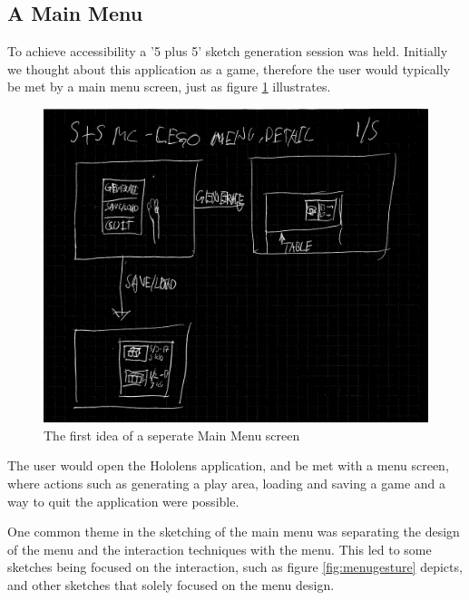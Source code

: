 \subsection{A Main Menu}
To achieve accessibility a '5 plus 5' sketch generation session was held. Initially we thought about this application as a game, therefore the user would typically be met by a main menu screen, just as figure \ref{fig:menu8} illustrates.
\begin{figure}[h]
	\centering
	\includegraphics[width=0.7\linewidth]{figures/Menu/menu8}
	\caption{The first idea of a seperate Main Menu screen}
	\label{fig:menu8}
\end{figure}
The user would open the Hololens application, and be met with a menu screen, where actions such as generating a play area, loading and saving a game and a way to quit the application were possible. \par
One common theme in the sketching of the main menu was separating the design of the menu and the interaction techniques with the menu. This led to some sketches being focused on the interaction, such as figure \ref{fig:menugesture} depicts, and other sketches that solely focused on the menu design.\par

